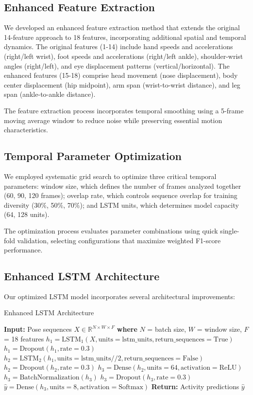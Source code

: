 \documentclass{iopconfser}
\begin{document}
\subsection{Enhanced Feature Extraction}

We developed an enhanced feature extraction method that extends the original 14-feature approach to 18 features, incorporating additional spatial and temporal dynamics. The original features (1-14) include hand speeds and accelerations (right/left wrist), foot speeds and accelerations (right/left ankle), shoulder-wrist angles (right/left), and eye displacement patterns (vertical/horizontal). The enhanced features (15-18) comprise head movement (nose displacement), body center displacement (hip midpoint), arm span (wrist-to-wrist distance), and leg span (ankle-to-ankle distance).

The feature extraction process incorporates temporal smoothing using a 5-frame moving average window to reduce noise while preserving essential motion characteristics.

\subsection{Temporal Parameter Optimization}

We employed systematic grid search to optimize three critical temporal parameters: window size, which defines the number of frames analyzed together (60, 90, 120 frames); overlap rate, which controls sequence overlap for training diversity (30\%, 50\%, 70\%); and LSTM units, which determines model capacity (64, 128 units).

The optimization process evaluates parameter combinations using quick single-fold validation, selecting configurations that maximize weighted F1-score performance.

\subsection{Enhanced LSTM Architecture}

Our optimized LSTM model incorporates several architectural improvements:

\begin{algorithm}[H]
\caption{Enhanced LSTM Architecture}
\begin{algorithmic}[1]
\STATE \textbf{Input:} Pose sequences $X \in \mathbb{R}^{N \times W \times F}$
\STATE \textbf{where} $N$ = batch size, $W$ = window size, $F$ = 18 features
\STATE 
\STATE $h_1 = \text{LSTM}_1(X, \text{units}=\text{lstm\_units}, \text{return\_sequences}=\text{True})$
\STATE $h_1 = \text{Dropout}(h_1, \text{rate}=0.3)$
\STATE 
\STATE $h_2 = \text{LSTM}_2(h_1, \text{units}=\text{lstm\_units}//2, \text{return\_sequences}=\text{False})$
\STATE $h_2 = \text{Dropout}(h_2, \text{rate}=0.3)$
\STATE 
\STATE $h_3 = \text{Dense}(h_2, \text{units}=64, \text{activation}=\text{ReLU})$
\STATE $h_3 = \text{BatchNormalization}(h_3)$
\STATE $h_3 = \text{Dropout}(h_3, \text{rate}=0.3)$
\STATE 
\STATE $\hat{y} = \text{Dense}(h_3, \text{units}=8, \text{activation}=\text{Softmax})$
\STATE \textbf{Return:} Activity predictions $\hat{y}$
\end{algorithmic}
\end{algorithm}
\end{document}
